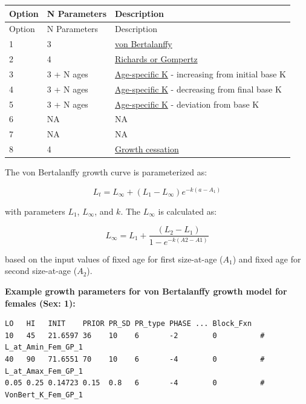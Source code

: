 \hypertarget{GrowthModelOptions}{}

\begin{longtable}{p{1cm} p{2cm} p{11.5cm}}
	\hline	
    Option & N Parameters & Description \Tstrut\Bstrut\\
	\hline
	\endfirsthead

	\hline
	Option & N Parameters & Description \Tstrut\Bstrut\\
	\hline
	\endhead
	\hline
	\endfoot
	\endlastfoot

	1 & 3 & \hyperlink{vonBert}{von Bertalanffy} \Bstrut\\
	2 & 4 & \hyperlink{Richards}{Richards or Gompertz} \Bstrut\\
	3 & 3 + N ages & \hyperlink{AgeSpecificK}{Age-specific K} - increasing from initial base K \Bstrut\\
	4 & 3 + N ages & \hyperlink{AgeSpecificK}{Age-specific K} - decreasing from final base K \Bstrut\\
    5 & 3 + N ages & \hyperlink{AgeSpecificK}{Age-specific K} - deviation from base K \Bstrut\\
	6 & NA & NA \\
	7 & NA & NA \\
	8 & 4 & \hyperlink{GrowthCessation}{Growth cessation} \\
	\hline
\end{longtable}


\hypertarget{vonBert}{}

The von Bertalanffy growth curve is parameterized as:

\begin{equation}
	L_t = L_\infty + (L_{1}-L_\infty)e^{-k(a-A_{1})}
\end{equation}

with parameters $L_{1}$, $L_\infty$, and $k$. The $L_\infty$ is calculated as:

\begin{equation}
	L_\infty = L_{1} + \frac{(L_2 - L_1)}{1-e^{-k(A2-A1)}}
\end{equation}

based on the input values of fixed age for first size-at-age ($A_1$) and fixed age for second size-at-age ($A_2$). 

\textbf{Example growth parameters for von Bertalanffy growth model for females (Sex: 1):}

\begin{verbatim}
LO   HI   INIT    PRIOR PR_SD PR_type PHASE ... Block_Fxn 
10   45   21.6597 36    10    6       -2        0          # L_at_Amin_Fem_GP_1
40   90   71.6551 70    10    6       -4        0          # L_at_Amax_Fem_GP_1
0.05 0.25 0.14723 0.15  0.8   6       -4        0          # VonBert_K_Fem_GP_1
\end{verbatim}

